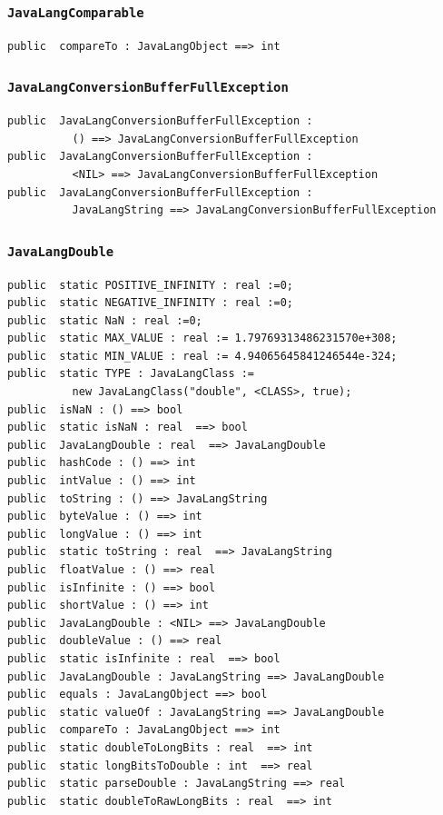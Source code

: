 \documentclass[\pformat,12pt]{article}
\begin{document}
\subsubsection{\texttt{JavaLangComparable}}
\begin{small}
\begin{verbatim}
public  compareTo : JavaLangObject ==> int

\end{verbatim}
\end{small}

\subsubsection{\texttt{JavaLangConversionBufferFullException}}
\begin{small}
\begin{verbatim}
public  JavaLangConversionBufferFullException : 
          () ==> JavaLangConversionBufferFullException
public  JavaLangConversionBufferFullException : 
          <NIL> ==> JavaLangConversionBufferFullException
public  JavaLangConversionBufferFullException : 
          JavaLangString ==> JavaLangConversionBufferFullException
\end{verbatim}
\end{small}

\subsubsection{\texttt{JavaLangDouble}}
\begin{small}
\begin{verbatim}
public  static POSITIVE_INFINITY : real :=0;
public  static NEGATIVE_INFINITY : real :=0;
public  static NaN : real :=0;
public  static MAX_VALUE : real := 1.79769313486231570e+308;
public  static MIN_VALUE : real := 4.94065645841246544e-324;
public  static TYPE : JavaLangClass := 
          new JavaLangClass("double", <CLASS>, true);
public  isNaN : () ==> bool
public  static isNaN : real  ==> bool
public  JavaLangDouble : real  ==> JavaLangDouble
public  hashCode : () ==> int
public  intValue : () ==> int
public  toString : () ==> JavaLangString
public  byteValue : () ==> int
public  longValue : () ==> int
public  static toString : real  ==> JavaLangString
public  floatValue : () ==> real
public  isInfinite : () ==> bool
public  shortValue : () ==> int
public  JavaLangDouble : <NIL> ==> JavaLangDouble
public  doubleValue : () ==> real
public  static isInfinite : real  ==> bool
public  JavaLangDouble : JavaLangString ==> JavaLangDouble
public  equals : JavaLangObject ==> bool
public  static valueOf : JavaLangString ==> JavaLangDouble
public  compareTo : JavaLangObject ==> int
public  static doubleToLongBits : real  ==> int
public  static longBitsToDouble : int  ==> real
public  static parseDouble : JavaLangString ==> real
public  static doubleToRawLongBits : real  ==> int
\end{verbatim}
\end{small}
\end{document}
